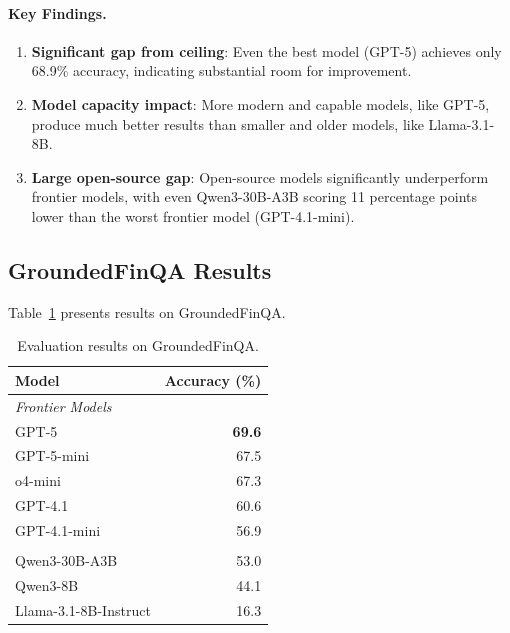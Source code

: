 \documentclass[11pt]{article}
\newcommand{\groundedfinqa}{GroundedFinQA\xspace}
\begin{document}
\paragraph{Key Findings.}
\begin{enumerate}
    \item \textbf{Significant gap from ceiling}: Even the best model (GPT-5) achieves only 68.9\% accuracy, indicating substantial room for improvement.
    \item \textbf{Model capacity impact}: More modern and capable models, like GPT-5, produce much better results than smaller and older models, like Llama-3.1-8B.
    \item \textbf{Large open-source gap}: Open-source models significantly underperform frontier models, with even Qwen3-30B-A3B scoring 11 percentage points lower than the worst frontier model (GPT-4.1-mini).
\end{enumerate}

\subsection{\groundedfinqa Results}

Table~\ref{tab:grounded_results} presents results on \groundedfinqa.

\begin{table}[t]
\centering
\small
\setlength{\tabcolsep}{8pt}
\begin{tabular}{lr}
\toprule
\textbf{Model} & \textbf{Accuracy (\%)} \\
\midrule
\multicolumn{2}{l}{\textit{Frontier Models}} \\
GPT-5                  & \textbf{69.6} \\
GPT-5-mini             & 67.5 \\
o4-mini                & 67.3 \\
GPT-4.1                & 60.6 \\
GPT-4.1-mini           & 56.9 \\
\addlinespace
\multicolumn{2}{l}{\textit{Open-Source Models}} \\
Qwen3-30B-A3B          & 53.0 \\
Qwen3-8B               & 44.1 \\
Llama-3.1-8B-Instruct  & 16.3 \\
\bottomrule
\end{tabular}
\caption{Evaluation results on \groundedfinqa.}
\label{tab:grounded_results}
\end{table}
\end{document}
